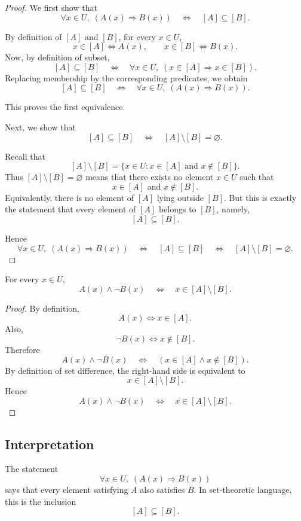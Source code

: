 \documentclass{article}
\begin{document}
	\begin{proof}
		We first show that
		\[
		\forall x\in U,\; (A(x)\Rightarrow B(x))
		\quad\Longleftrightarrow\quad
		[A]\subseteq[B].
		\]
		
		By definition of \([A]\) and \([B]\), for every \(x\in U\),
		\[
		x\in[A] \iff A(x),
		\qquad
		x\in[B] \iff B(x).
		\]
		Now, by definition of subset,
		\[
		[A]\subseteq[B]
		\quad\Longleftrightarrow\quad
		\forall x\in U,\; (x\in[A]\Rightarrow x\in[B]).
		\]
		Replacing membership by the corresponding predicates, we obtain
		\[
		[A]\subseteq[B]
		\quad\Longleftrightarrow\quad
		\forall x\in U,\; (A(x)\Rightarrow B(x)).
		\]
		
		This proves the first equivalence.
		
		Next, we show that
		\[
		[A]\subseteq[B]
		\quad\Longleftrightarrow\quad
		[A]\setminus[B]=\varnothing.
		\]
		
		Recall that
		\[
		[A]\setminus[B]=\{x\in U : x\in[A]\text{ and }x\notin[B]\}.
		\]
		Thus \([A]\setminus[B]=\varnothing\) means that there exists no element \(x\in U\) such that
		\[
		x\in[A]\text{ and }x\notin[B].
		\]
		Equivalently, there is no element of \([A]\) lying outside \([B]\). But this is exactly the statement that every element of \([A]\) belongs to \([B]\), namely,
		\[
		[A]\subseteq[B].
		\]
		
		Hence
		\[
		\forall x\in U,\; (A(x)\Rightarrow B(x))
		\quad\Longleftrightarrow\quad
		[A]\subseteq[B]
		\quad\Longleftrightarrow\quad
		[A]\setminus[B]=\varnothing.
		\]
	\end{proof}
	
	\begin{proposition}
		For every \(x\in U\),
		\[
		A(x)\land \neg B(x)
		\quad\Longleftrightarrow\quad
		x\in[A]\setminus[B].
		\]
	\end{proposition}
	
	\begin{proof}
		By definition,
		\[
		A(x)\iff x\in[A].
		\]
		Also,
		\[
		\neg B(x)\iff x\notin[B].
		\]
		Therefore
		\[
		A(x)\land \neg B(x)
		\quad\Longleftrightarrow\quad
		(x\in[A]\land x\notin[B]).
		\]
		By definition of set difference, the right-hand side is equivalent to
		\[
		x\in[A]\setminus[B].
		\]
		Hence
		\[
		A(x)\land \neg B(x)
		\quad\Longleftrightarrow\quad
		x\in[A]\setminus[B].
		\]
	\end{proof}
	
	\subsection*{Interpretation}
	The statement
	\[
	\forall x\in U,\; (A(x)\Rightarrow B(x))
	\]
	says that every element satisfying \(A\) also satisfies \(B\). In set-theoretic language, this is the inclusion
	\[
	[A]\subseteq[B].
	\]
	
\end{document}
